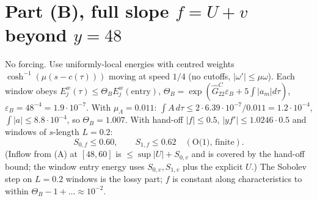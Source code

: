 \documentclass[11pt]{article}
\begin{document}
\section{Part (B), full slope $f=U+v$ beyond $y=48$}
No forcing. Use uniformly-local energies with centred weights $\cosh^{-1}(\mu(s-c(\tau)))$ moving at speed $1/4$ (no cutoffs, $|\omega'|\le\mu\omega$). Each window obeys $E^w_j(\tau)\le\Theta_BE^w_j(\text{entry})$, $\Theta_B=\exp(\hat G^C_{22}\varepsilon_B+5\!\int\!|a_m|d\tau)$, $\varepsilon_B=48^{-4}=1.9\cdot10^{-7}$. With $\mu_\Lambda=0.011$: $\int A\,d\tau\le2\cdot6.39\cdot10^{-7}/0.011=1.2\cdot10^{-4}$, $\int|a|\le8.8\cdot10^{-4}$, so $\Theta_B=1.007$. With hand-off $|f|\le0.5$, $|yf'|\le1.0246\cdot0.5$ and windows of $s$-length $L=0.2$:
$$S_{0,f}\le0.60,\qquad S_{1,f}\le0.62\quad(\text{O(1), finite}).$$
(Inflow from (A) at $[48,60]$ is $\le\sup|U|+S_{0,v}$ and is covered by the hand-off bound; the window entry energy uses $S_{0,v},S_{1,v}$ plus the explicit $U$.) The Sobolev step on $L=0.2$ windows is the lossy part; $f$ is constant along characteristics to within $\Theta_B-1+\dots\approx10^{-2}$.
\end{document}
